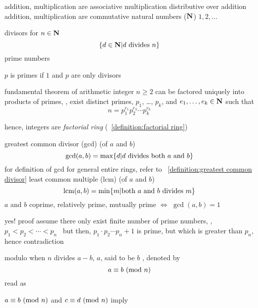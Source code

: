 \documentclass[17pt,landscape]{foils}
\begin{document}
\vitem [-]
addition, multiplication are associative
\vitem [-]
multiplication distributive over addition
\vitem [-]
addition, multiplication are commutative
\eit
\eit
\vitem
natural numbers (${\mbox{\bf N}}$)
\bit
\vitem
$1, 2, \ldots$
\eit
\eit
{}
\bit
\item divisors for $n\in{\mbox{\bf N}}$
\[
\{d\in{\mbox{\bf N}}| d \mbox{ divides } n\}
\]
\vitem prime numbers
\bit
\item $p$ is primes if $1$ and $p$ are only divisors
\eit
\eit
{}
\begin{mytheorem}{fundamental theorem of arithmetic}
integer $n\geq2$ can be factored uniquely into products of primes,
\ie,
exist distinct primes, $p_1$, \ldots, $p_k$, and $e_1,\ldots, e_k\in{\mbox{\bf N}}$
such that
$$
n = p_1^{e_1} p_2^{e_2} \cdots p_k^{e_k}
$$
\end{mytheorem}
\bit
\vitem
hence,
integers are \emph{factorial ring}
(~\ref{definition:factorial ring})
\eit
\vfill
{}
\bit
\item
greatest common divisor (gcd) (of $a$ and $b$)
\[
\gcd(a,b) = \max \{d|d\mbox{ divides both }a \mbox{ and } b\}
\]
\bit
\vitem
for definition of gcd
for general entire rings,
refer to ~\ref{definition:greatest common divisor}
\eit
\vitem
least common multiple (lcm) (of $a$ and $b$)
\[
\mbox{lcm}(a,b) = \min \{m|\mbox{both } a \mbox{ and } b \mbox{ divides }m\}
\]
\vitem
$a$ and $b$ coprime, relatively prime, mutually prime $\Leftrightarrow$ $\gcd(a,b)=1$
\eit
\vfill
{}
\bit
\item
yes!
\vitem
proof
\bit
\vitem
assume there only exist finite number of prime numbers, \eg, $p_1 < p_2 < \cdots <p_n$\
\vitem
but then, $p_1 \cdot p_2 \cdots p_n + 1$ is prime,
but which is greater than $p_n$, hence contradiction
\eit
\eit
\vfill
{}
\begin{mydefinition}{modulo}
when $n$ divides $a-b$,
$a$, said to be  $b$ ,
denoted by
$$
a \equiv b \ (\mathrm{mod}\ n)
$$
read as 
\end{mydefinition}
\bit
\vitem
$a\equiv b\ (\mathrm{mod}\ n)$ and $c\equiv d\ (\mathrm{mod}\ n)$ imply
\end{document}
